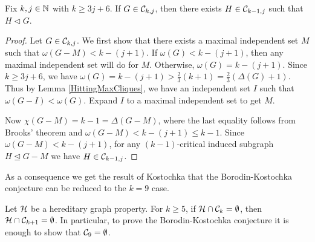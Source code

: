 \begin{lem}\label{InductingOnC}
Fix $k, j \in \mathbb{N}$ with $k \geq 3j + 6$.  If $G \in \mathcal{C}_{k, j}$, then there exists $H \in \mathcal{C}_{k-1, j}$
such that $H \lhd G$. 
\end{lem}
\begin{proof}
Let $G \in \mathcal{C}_{k, j}$. We first show that there exists a maximal independent
set $M$ such that  $\omega(G - M) < k - (j + 1)$.   If $\omega(G)
< k - (j + 1)$, then any maximal independent set will do for $M$.
Otherwise, $\omega(G) = k - (j + 1)$.  Since $k \geq 3j + 6$, we have $\omega(G) = k - (j + 1) > \frac23(k + 1) = \frac23(\Delta(G) + 1)$.  Thus by Lemma
\ref{HittingMaxCliques}, we have an independent set $I$ such that
$\omega(G - I) < \omega(G)$.  Expand $I$ to a maximal independent set
to get $M$.

Now $\chi(G - M) = k - 1 = \Delta(G - M)$, where the last equality
follows from Brooks' theorem and $\omega(G - M) < k - (j + 1) \leq k - 1$.  Since $\omega(G - M) < k - (j + 1)$, for any $(k - 1)$-critical induced subgraph $H \unlhd G - M$ we have $H \in \mathcal{C}_{k - 1, j}$.
\end{proof}

As a consequence we get the result of Kostochka that the Borodin-Kostochka conjecture can be reduced to the $k = 9$ case.

\begin{lem}\label{HereditaryReduction}
Let $\mathcal{H}$ be a hereditary graph property. For $k \geq 5$, if $\mathcal{H} \cap \mathcal{C}_{k} = \emptyset$, then $\mathcal{H} \cap \mathcal{C}_{k+1} = \emptyset$.  In particular, to prove the Borodin-Kostochka conjecture it is enough to show that $\mathcal{C}_{9} = \emptyset$.
\end{lem}
